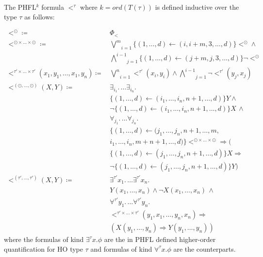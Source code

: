 \begin{definition}
    \label{definition:lower_bound_less}
    The PHFL$^k$ formula $<^\tau$ where $k = ord(T(\tau))$ is defined inductive over the type $\tau$ as follows:

    \begin{align*}
        <^\odot \coloneqq &\,\Phi_< \\
        <^{\odot \times \dots \times \odot} \coloneqq &\,\underset{i = 1}{\overset{m}{\bigvee}}\{(1, \dots, d)
        \leftarrow (i, i + m, 3, \dots, d)\} <^\odot \wedge \\
        &\,\underset{j = 1}{\overset{i - 1}{\bigwedge}}\{(1, \dots, d) \leftarrow (j + m, j, 3, \dots, d)\} \neg
        <^\odot\\
        <^{\tau' \times \dots \times \tau'}(x_1, y_1, \dots, x_1, y_n) \coloneqq &\,\underset{i =
        1}{\overset{n}{\bigvee}}<^{\tau'}(x_i, y_i) \wedge \underset{j = 1}{\overset{i - 1}{\bigwedge}}
        \neg <^{\tau'}(y_j, x_j)\\
        <^{(\odot, \dots, \odot)}(X, Y) \coloneqq &\,\exists_{i_1}.\, \dots \exists_{i_n}. \\&\,\{(1, \dots, d)
        \leftarrow  (i_1, \dots, i_n, n + 1, \dots, d)\}Y \wedge \\&\,\neg \{(1, \dots, d) \leftarrow (i_1, \dots,
        i_n, n + 1, \dots, d)\} X\,\wedge\\&\, \forall_{j_1}. \,\dots \forall_{j_n}. \\&\,\{(1, \dots, d)
        \leftarrow (j_1, \dots, j_n, n+1, \dots, m, \\&\,i_1, \dots, i_n, m + n + 1, \dots, d)\}<^{\odot
        \times \dots \times \odot} \Rightarrow (\\&\,\{(1, \dots, d) \leftarrow (j_1, \dots, j_n, n + 1, \dots, d)\}X
        \Rightarrow \\&\,\neg \{(1, \dots, d) \leftarrow (j_1, \dots, j_n, n + 1, \dots, d)\} Y)
        \\
        <^{(\tau', \dots, \tau')}(X, Y) \coloneqq &\,\exists^{\tau'}x_1. \,\dots \exists^{\tau'}x_n. \\&\,Y(x_1,
        \dots, x_n)
        \wedge \neg X(x_1, \dots, x_n)\,\wedge \\&\,\forall^{\tau'}y_1. \,\dots \forall^{\tau'}y_n. \\&\,<^{\tau'
        \times \dots \times \tau'}
        (y_1, x_1, \dots, y_n, x_n) \Rightarrow \\&\,(X(y_1, \dots, y_n) \Rightarrow Y(y_1, \dots, y_n))
    \end{align*}
    where the formulas of kind $\exists^\tau x.\phi$ are the in PHFL defined higher-order quantification for HO type
    $\tau$
    and formulas of kind $\forall^\tau x.\phi$ are the counterparts.
\end{definition}


